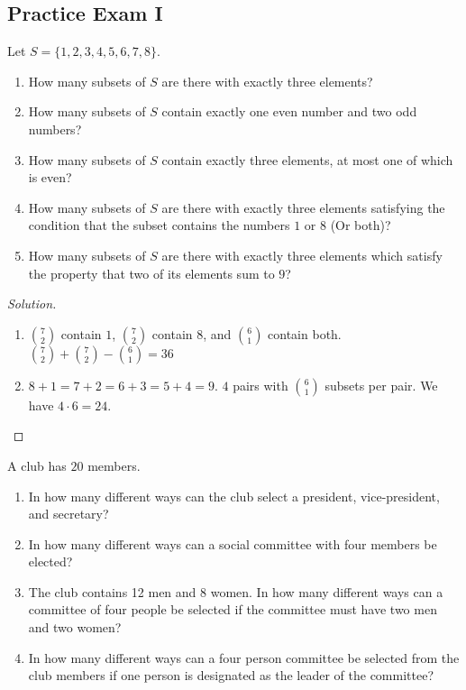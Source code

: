 \documentclass[crop=false,class=book,oneside]{standalone}
\begin{document}
    \subsection{Practice Exam I}
    \begin{problem}
    Let $S = \{1,2,3,4,5,6,7,8\}$.
    \begin{enumerate}
        \item How many subsets of $S$ are there with exactly three elements?
        \item How many subsets of $S$ contain exactly one even number and two odd numbers?
        \item How many subsets of $S$ contain exactly three elements, at most one of which is even?
        \item How many subsets of $S$ are there with exactly three elements satisfying the condition that the subset contains the numbers $1$ or $8$ (Or both)?
        \item How many subsets of $S$ are there with exactly three elements which satisfy the property that two of its elements sum to $9$?
    \end{enumerate}
    \end{problem}
    \begin{proof}[Solution]
    \
    \begin{enumerate}
    \begin{multicols}{3}
        \item $\binom{8}{3} = \frac{8!}{3!(8-3)!} = 56$
        \item $\binom{4}{1}\binom{4}{2} = 24$
        \item $\binom{4}{1} \binom{4}{2} + \binom{4}{0} \binom{4}{3} = 28$.
    \end{multicols}
        \item $\binom{7}{2}$ contain $1$, $\binom{7}{2}$ contain $8$, and $\binom{6}{1}$ contain both. $\binom{7}{2}+\binom{7}{2}-\binom{6}{1}=36$
        \item $8+1=7+2=6+3=5+4=9$. $4$ pairs with $\binom{6}{1}$ subsets per pair. We have $4\cdot 6 = 24$.
    \end{enumerate}
    \end{proof}
    \begin{problem}
    A club has $20$ members.
    \begin{enumerate}
        \item In how many different ways can the club select a president, vice-president, and secretary?
        \item In how many different ways can a social committee with four members be elected?
        \item The club contains 12 men and 8 women. In how many different ways can a committee of four people be selected if the committee must have two men and two women?
        \item In how many different ways can a four person committee be selected from the club members if one person is designated as the leader of the committee?
    \end{enumerate}
    \end{problem}
\end{document}
